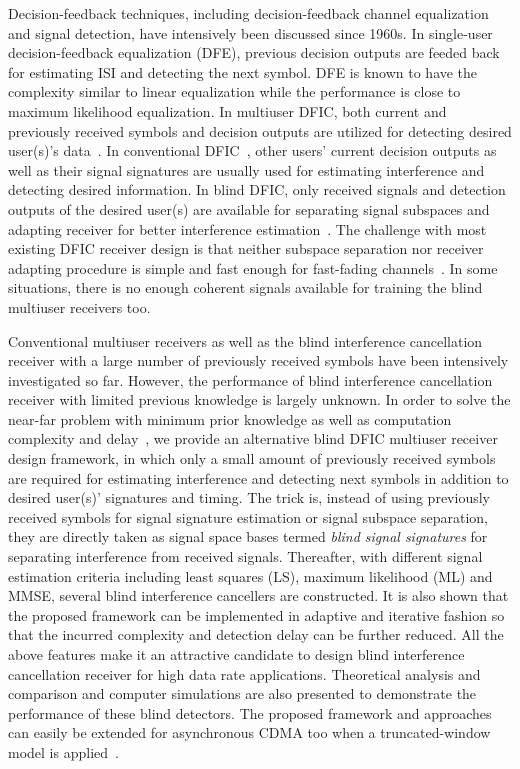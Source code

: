 \documentclass[conference]{IEEEtran}
\begin{document}
Decision-feedback techniques, including decision-feedback channel
equalization and signal detection, have intensively been discussed
since 1960s. In single-user decision-feedback equalization (DFE),
previous decision outputs are feeded back for estimating ISI and
detecting the next symbol. DFE is known to have the complexity
similar to linear equalization while the performance is close to
maximum likelihood equalization. In multiuser DFIC, both current
and previously received symbols and decision outputs are utilized
for detecting desired user(s)'s data~\cite{Verd98}. In
conventional DFIC~\cite{Verd98}, other users' current decision
outputs as well as their signal signatures are usually used for
estimating interference and detecting desired information. In
blind DFIC, only received signals and detection outputs of the
desired user(s) are available for separating signal subspaces and
adapting receiver for better interference
estimation~\cite{Wang98}. The challenge with most existing DFIC
receiver design is that neither subspace separation nor receiver
adapting procedure is simple and fast enough for fast-fading
channels~\cite{Madh94,Wang98,Zhang02}. In some situations, there
is no enough coherent signals available for training the blind
multiuser receivers too.

Conventional multiuser receivers as well as the blind interference
cancellation receiver with a large number of previously received
symbols have been intensively investigated so far. However, the
performance of blind interference cancellation receiver with
limited previous knowledge is largely unknown. In order to solve
the near-far problem with minimum prior knowledge as well as
computation complexity and delay~\cite{Wang03d,Wang05A}, we
provide an alternative blind DFIC multiuser receiver design
framework, in which only a small amount of previously received
symbols are required for estimating interference and detecting
next symbols in addition to desired user(s)' signatures and
timing. The trick is, instead of using previously received symbols
for signal signature estimation or signal subspace separation,
they are directly taken as signal space bases termed {\em blind
signal signatures} for separating interference from received
signals. Thereafter, with different signal estimation criteria
including least squares (LS), maximum likelihood (ML) and MMSE,
several blind interference cancellers are constructed. It is also
shown that the proposed framework can be implemented in adaptive
and iterative fashion so that the incurred complexity and
detection delay can be further reduced. All the above features
make it an attractive candidate to design blind interference
cancellation receiver for high data rate applications. Theoretical
analysis and comparison and computer simulations are also
presented to demonstrate the performance of these blind detectors.
The proposed framework and approaches can easily be extended for
asynchronous CDMA too when a truncated-window model is
applied~\cite{Verd98}.
\end{document}
